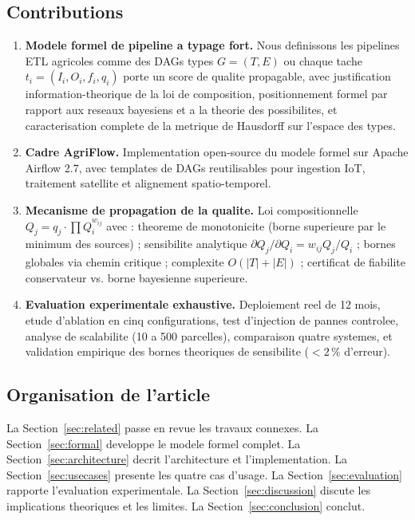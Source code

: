 \documentclass[12pt,a4paper]{article}
\theoremstyle{plain}
\theoremstyle{definition}
\theoremstyle{remark}
\begin{document}
\subsection{Contributions}

\begin{contribbox}
\begin{enumerate}[leftmargin=1.2em,itemsep=4pt]
  \item \textbf{Modele formel de pipeline a typage fort.}
    Nous definissons les pipelines ETL agricoles comme des DAGs types
    $G=(T,E)$ ou chaque tache $t_i=(I_i,O_i,f_i,q_i)$ porte un score
    de qualite propagable, avec justification information-theorique de la
    loi de composition, positionnement formel par rapport aux reseaux
    bayesiens et a la theorie des possibilites, et caracterisation
    complete de la metrique de Hausdorff sur l'espace des types.

  \item \textbf{Cadre AgriFlow.}
    Implementation open-source du modele formel sur Apache Airflow 2.7,
    avec templates de DAGs reutilisables pour ingestion IoT,
    traitement satellite et alignement spatio-temporel.

  \item \textbf{Mecanisme de propagation de la qualite.}
    Loi compositionnelle $Q_j = q_j \cdot \prod Q_i^{w_{ij}}$ avec :
    theoreme de monotonicite (borne superieure par le minimum des sources) ;
    sensibilite analytique $\partial Q_j/\partial Q_i = w_{ij} Q_j/Q_i$ ;
    bornes globales via chemin critique ; complexite $O(|T|+|E|)$ ;
    certificat de fiabilite conservateur vs. borne bayesienne superieure.

  \item \textbf{Evaluation experimentale exhaustive.}
    Deploiement reel de 12 mois, etude d'ablation en cinq configurations,
    test d'injection de pannes controlee, analyse de scalabilite
    (10 a 500 parcelles), comparaison quatre systemes, et validation
    empirique des bornes theoriques de sensibilite ($<2\,\%$ d'erreur).
\end{enumerate}
\end{contribbox}

\subsection{Organisation de l'article}

La Section~\ref{sec:related} passe en revue les travaux connexes.
La Section~\ref{sec:formal} developpe le modele formel complet.
La Section~\ref{sec:architecture} decrit l'architecture et l'implementation.
La Section~\ref{sec:usecases} presente les quatre cas d'usage.
La Section~\ref{sec:evaluation} rapporte l'evaluation experimentale.
La Section~\ref{sec:discussion} discute les implications theoriques
et les limites. La Section~\ref{sec:conclusion} conclut.
\end{document}

